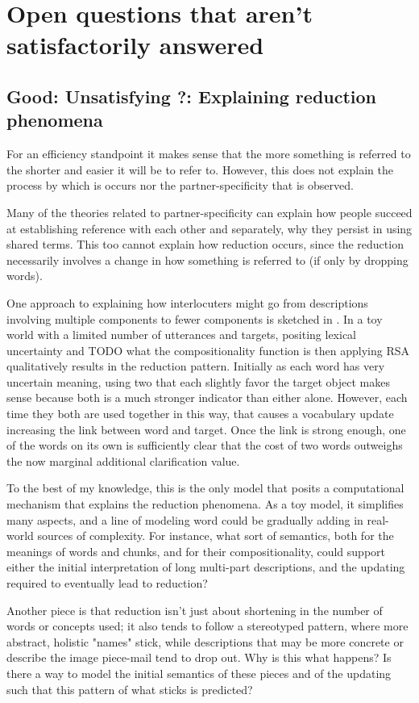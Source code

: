 \documentclass[]{article}
\begin{document}
\section{Open questions that aren't satisfactorily answered}
\subsection{Good: Unsatisfying ?: Explaining reduction phenomena}

For an efficiency standpoint it makes sense that the more something is referred to the shorter and easier it will be to refer to. However, this does not explain the process by which is occurs nor the partner-specificity that is observed. 

Many of the theories related to partner-specificity can explain how people succeed at establishing reference with each other and separately, why they persist in using shared terms. This too cannot explain how reduction occurs, since the reduction necessarily involves a change in how something is referred to (if only by dropping words). 

One approach to explaining how interlocuters might go from descriptions involving multiple components to fewer components is sketched in \cite{hawkins2021}. In a toy world with a limited number of utterances and targets, positing lexical uncertainty and TODO what the compositionality function is then applying RSA qualitatively results in the reduction pattern. Initially as each word has very uncertain meaning, using two that each slightly favor the target object makes sense because both is a much stronger indicator than either alone. However, each time they both are used together in this way, that causes a vocabulary update increasing the link between word and target. Once the link is strong enough, one of the words on its own is sufficiently clear that the cost of two words outweighs the now marginal additional clarification value. 

To the best of my knowledge, this is the only model that posits a computational mechanism that explains the reduction phenomena. As a toy model, it simplifies many aspects, and a line of modeling word could be gradually adding in real-world sources of complexity. For instance, what sort of semantics, both for the meanings of words and chunks, and for their compositionality, could support either the initial interpretation of long multi-part descriptions, and the updating required to eventually lead to reduction? 

Another piece is that reduction isn't just about shortening in the number of words or concepts used; it also tends to follow a stereotyped pattern, where more abstract, holistic "names" stick, while descriptions that may be more concrete or describe the image piece-mail tend to drop out. Why is this what happens?  Is there a way to model the initial semantics of these pieces and of the updating such that this pattern of what sticks is predicted? 
\end{document}
